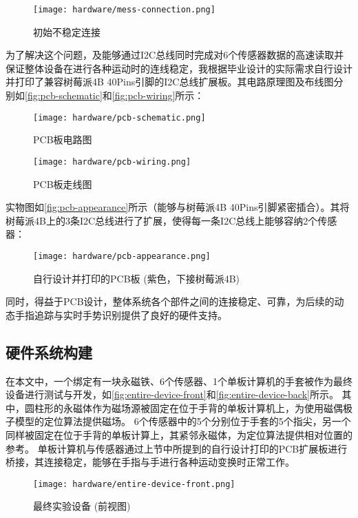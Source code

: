 \begin{figure}[H]
    \centering
    \texttt{[image: hardware/mess-connection.png]}
    \caption{\label{fig:mess-connection}初始不稳定连接}
\end{figure}

为了解决这个问题，及能够通过I2C总线同时完成对6个传感器数据的高速读取并保证整体设备在进行各种运动时的连线稳定，我根据毕业设计的实际需求自行设计并打印了兼容树莓派4B 40Pins引脚的I2C总线扩展板。其电路原理图及布线图分别如\autoref{fig:pcb-schematic}和\autoref{fig:pcb-wiring}所示：

\begin{figure}[H]
    \centering
    \texttt{[image: hardware/pcb-schematic.png]}
    \caption{\label{fig:pcb-schematic}PCB板电路图}
\end{figure}

\begin{figure}[H]
    \centering
    \texttt{[image: hardware/pcb-wiring.png]}
    \caption{\label{fig:pcb-wiring}PCB板走线图}
\end{figure}

实物图如\autoref{fig:pcb-appearance}所示（能够与树莓派4B 40Pins引脚紧密插合）。其将树莓派4B上的3条I2C总线进行了扩展，使得每一条I2C总线上能够容纳2个传感器：

\begin{figure}[H]
    \centering
    \texttt{[image: hardware/pcb-appearance.png]}
    \caption{\label{fig:pcb-appearance}自行设计并打印的PCB板 (紫色，下接树莓派4B)}
\end{figure}

同时，得益于PCB设计，整体系统各个部件之间的连接稳定、可靠，为后续的动态手指追踪与实时手势识别提供了良好的硬件支持。
\subsection{硬件系统构建}
在本文中，一个绑定有一块永磁铁、6个传感器、1个单板计算机的手套被作为最终设备进行测试与开发，如\autoref{fig:entire-device-front}和\autoref{fig:entire-device-back}所示。
其中，圆柱形的永磁体作为磁场源被固定在位于手背的单板计算机上，为使用磁偶极子模型的定位算法提供磁场。
6个传感器中的5个分别位于手套的5个指尖，另一个同样被固定在位于手背的单板计算上，其紧邻永磁体，为定位算法提供相对位置的参考。
单板计算机与传感器通过上节中所提到的自行设计打印的PCB扩展板进行桥接，其连接稳定，能够在手指与手进行各种运动变换时正常工作。

\begin{figure}[H]
    \centering
    \texttt{[image: hardware/entire-device-front.png]}
    \caption{\label{fig:entire-device-front}最终实验设备 (前视图)}
\end{figure}

